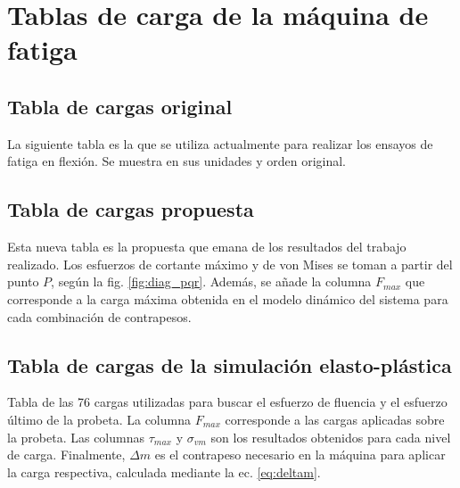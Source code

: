 %
\chapter{Tablas de carga de la máquina de fatiga}
\label{ch:anexo_b}

\section{Tabla de cargas original}
\label{sec:anexob1}

La siguiente tabla es la que se utiliza actualmente para realizar los ensayos de fatiga en flexión. Se muestra en sus unidades y orden original.



\section{Tabla de cargas propuesta}
\label{sec:anexob2}

Esta nueva tabla es la propuesta que emana de los resultados del trabajo realizado. Los esfuerzos de cortante máximo y de von Mises se toman a partir del punto $P$, según la fig. \ref{fig:diag_pqr}. Además, se añade la columna  $F_{max}$ que corresponde a la carga máxima obtenida en el modelo dinámico del sistema para cada combinación de contrapesos.



\section{Tabla de cargas de la simulación elasto-plástica}
\label{sec:anexob3}

Tabla de las 76 cargas utilizadas para buscar el esfuerzo de fluencia y el esfuerzo último de la probeta. La columna $F_{max}$ corresponde a las cargas aplicadas sobre la probeta. Las columnas $\tau_{max}$ y $\sigma_{vm}$ son los resultados obtenidos para cada nivel de carga. Finalmente, $\Delta m$ es el contrapeso necesario en la máquina para aplicar la carga respectiva, calculada mediante la ec. \ref{eq:deltam}.

